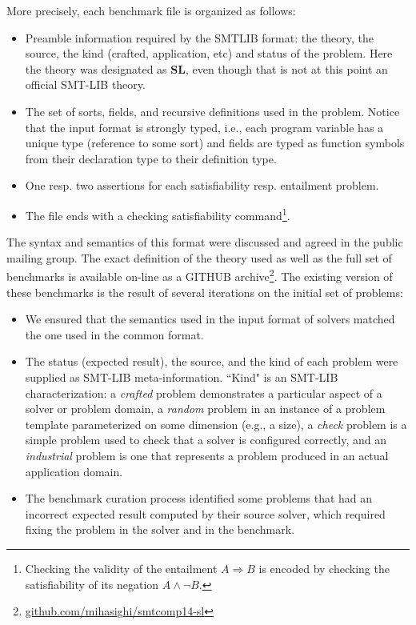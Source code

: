 \documentclass[twoside,11pt]{article}
\newcommand{\limp}{\Rightarrow}
\newcommand{\SLEEK}{\textsc{Sleek}}
\begin{document}
More precisely, each benchmark file is organized as follows:
\begin{itemize}
\item Preamble information required by the SMTLIB format: the theory, the source, the kind (crafted, application, etc) and status of the problem.  Here the theory was designated as \textbf{SL}, even though that is not at this point an official SMT-LIB theory. %
\item The set of sorts, fields, and recursive definitions used in the problem. Notice that the input format is strongly typed, i.e., each program variable has a unique type (reference to some sort) and 
fields are typed as function symbols from their declaration type to their definition type. 
\item One resp. two assertions for each satisfiability resp. entailment problem. 
\item The file ends with a checking satisfiability command\footnote{Checking the validity of the entailment $A\limp B$ is encoded by checking the satisfiability of its negation $A \land \lnot B$.}.
\end{itemize}

The syntax and semantics of this format were discussed and agreed in the public mailing group. 
The exact definition of the theory used as well as the full set of benchmarks is available on-line as a GITHUB archive\footnote{\url{github.com/mihasighi/smtcomp14-sl}}.
The existing version of these benchmarks is the result of several iterations on the initial set of problems:
\begin{itemize}
\item We ensured that the semantics used in the input format of solvers matched the one used in the common format. 
\item The status (expected result), the source, and the kind of each problem were supplied as SMT-LIB meta-information. ``Kind" is an SMT-LIB characterization: a \textit{crafted} problem demonstrates a particular aspect of a solver or problem domain, a \textit{random} problem in an instance of a problem template parameterized on some dimension (e.g., a size), a \textit{check} problem is a simple problem used to check that a solver is configured correctly, and an \textit{industrial} problem is one that represents a problem produced in an actual application domain.
\item The benchmark curation process identified some problems that had an incorrect expected result computed by their source solver, which required fixing the problem in the solver and in the benchmark.
\end{itemize}
\end{document}
